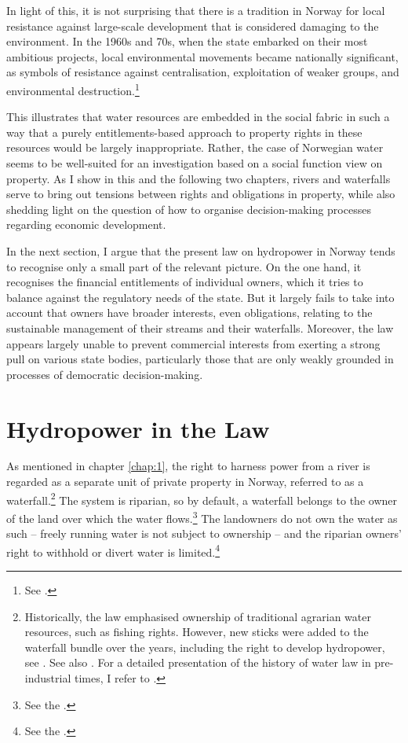 In light of this, it is not surprising that there is a tradition in Norway for local resistance against large-scale development that is considered damaging to the environment. In the 1960s and 70s, when the state embarked on their most ambitious projects, local environmental movements became nationally significant, as symbols of resistance against centralisation, exploitation of weaker groups, and environmental destruction.\footnote{See \cite{nilsen08}.}

This illustrates that water resources are embedded in the social fabric in such a way that a purely entitlements-based approach to property rights in these resources would be largely inappropriate. Rather, the case of Norwegian water seems to be well-suited for an investigation based on a social function view on property. As I show in this and the following two chapters, rivers and waterfalls serve to bring out tensions between rights and obligations in property, while also shedding light on the question of how to organise decision-making processes regarding economic development.

In the next section, I argue that the present law on hydropower in Norway tends to recognise only a small part of the relevant picture. On the one hand, it recognises the financial entitlements of individual owners, which it tries to balance against the regulatory needs of the state. But it largely fails to take into account that owners have broader interests, even obligations, relating to the sustainable management of their streams and their waterfalls. Moreover, the law appears largely unable to prevent commercial interests from exerting a strong pull on various state bodies, particularly those that are only weakly grounded in processes of democratic decision-making.

\section{Hydropower in the Law}\label{sec:4:3}

As mentioned in chapter \ref{chap:1}, the right to harness power from a river is regarded as a separate unit of private property in Norway, referred to as a waterfall.\footnote{Historically, the law emphasised ownership of traditional agrarian water resources, such as fishing rights. However, new sticks were added to the waterfall bundle over the years, including the right to develop hydropower, see \cite[14-32]{vislie44}. See also \cite[108]{nordtveit15}. For a detailed presentation of the history of water law in pre-industrial times, I refer to \cite{motzfeld08}.} The system is riparian, so by default, a waterfall belongs to the owner of the land over which the water flows.\footnote{See the \dni\cite[13]{wra00}.} The landowners do not own the water as such -- freely running water is not subject to ownership -- and the riparian owners' right to withhold or divert water is limited.\footnote{See the \dni\cite[8|15]{wra00}.} 

